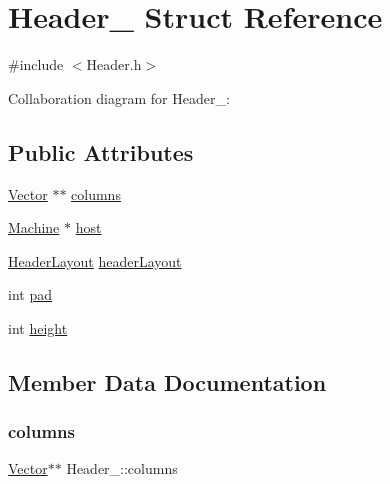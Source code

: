 \hypertarget{structHeader__}{}\section{Header\+\_\+ Struct Reference}
\label{structHeader__}


{\ttfamily \#include $<$Header.\+h$>$}



Collaboration diagram for Header\+\_\+\+:
\subsection*{Public Attributes}
\begin{DoxyCompactItemize}
\item 
\hyperlink{Vector_8h_a8297b82ce917cd21838596b7e3a7faa8}{Vector} $\ast$$\ast$ \hyperlink{structHeader___af4b3c832bb16b2317541710f2b8b5c17}{columns}
\item 
\hyperlink{Machine_8h_aa3706f95e4706b9d02979efcabb1341d}{Machine} $\ast$ \hyperlink{structHeader___aa1af1b14f9d80e73efef4da406a1835b}{host}
\item 
\hyperlink{HeaderLayout_8h_afc9cb7b84041249bac419260f679b6a9}{Header\+Layout} \hyperlink{structHeader___a717b68c4822daa2123467321078f8fa9}{header\+Layout}
\item 
int \hyperlink{structHeader___a539a14a1eca2a97219ca15989b6d3a39}{pad}
\item 
int \hyperlink{structHeader___a379b3e4e65579fe01e4e075a02171b00}{height}
\end{DoxyCompactItemize}


\subsection{Member Data Documentation}
\mbox{\label{structHeader___af4b3c832bb16b2317541710f2b8b5c17}} 
\subsubsection{\texorpdfstring{columns}{columns}}
{\footnotesize\ttfamily \hyperlink{Vector_8h_a8297b82ce917cd21838596b7e3a7faa8}{Vector}$\ast$$\ast$ Header\+\_\+\+::columns}

\mbox{\label{structHeader___a717b68c4822daa2123467321078f8fa9}} 
